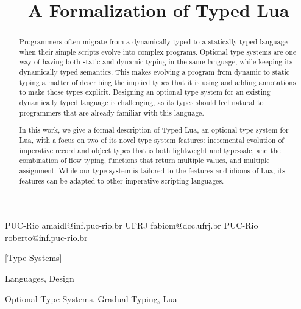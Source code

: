 \documentclass[10pt]{sigplanconf}
\begin{document}
\setlength{\pdfpageheight}{\paperheight}
\setlength{\pdfpagewidth}{\paperwidth}



\title{A Formalization of Typed Lua}

           {PUC-Rio}
           {amaidl@inf.puc-rio.br}
           {UFRJ}
           {fabiom@dcc.ufrj.br}
           {PUC-Rio}
           {roberto@inf.puc-rio.br}

\maketitle

\begin{abstract}
Programmers often migrate from a dynamically typed
to a statically typed language when their simple scripts
evolve into complex programs. Optional type systems are
one way of having both static and dynamic typing
in the same language, while keeping its dynamically typed
semantics. This makes evolving a program from dynamic to
static typing a matter of describing the implied types that
it is using and adding annotations to make those types explicit.
Designing an optional type system for
an existing dynamically typed language is challenging, as its types should feel natural to programmers that are already familiar with
this language.

In this work, we give a formal description of Typed Lua, an
optional type system for Lua, with a focus on two of its novel type system features: incremental evolution of imperative record and object types that is both lightweight and type-safe, and
the combination of flow typing, functions that return multiple values, and multiple assignment. While our type system is tailored to the features and idioms of Lua, its features can be adapted to other imperative scripting languages.
\end{abstract}

[Type Systems]

\terms
Languages, Design

\keywords
Optional Type Systems, Gradual Typing, Lua
\end{document}
